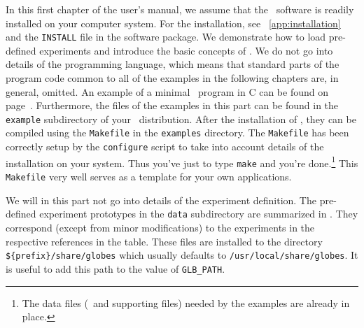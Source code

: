 In this first chapter of the user's manual, we assume that the \GLOBES\ 
software is readily installed on your computer system. For the installation,
see \App~\ref{app:installation} and the {\tt INSTALL} file in the
software package. We demonstrate how to load pre-defined experiments 
and introduce the basic concepts of \GLOBES . We do not go
into details of the programming language, which means that standard parts
of the program code common to all of the examples in the following chapters 
are, in general, omitted.
An example of a minimal \GLOBES\ program in C can be found on 
page~\pageref{ex:c}. Furthermore, the files of the examples in this part 
can be found in the \verb+example+ subdirectory of your \GLOBES\ distribution.
 \index{norm}{Examples} 
After the installation of \GLOBES, they can be compiled using 
the \verb+Makefile+ in the \verb+examples+
 directory. The  \verb+Makefile+ has been correctly setup by the 
\verb+configure+
script to take into account details of the installation on your system. Thus
you've just to type \verb+make+ and you're done.\footnote{The  
data files (\AEDL\ and supporting files) needed by the
examples are already in place.} This \verb+Makefile+ very well serves
as a template for your own applications.

We will in this part not go into details of the experiment
definition. The pre-defined experiment prototypes in the {\tt data}
subdirectory are summarized in \tabl{experiments}. They correspond
(except from minor modifications) to the experiments in the
respective references in the table. These files are installed to
the directory \verb+${prefix}/share/globes+ which usually defaults
to  \verb+/usr/local/share/globes+. It is useful to add this path
to the value of \verb+GLB_PATH+.


